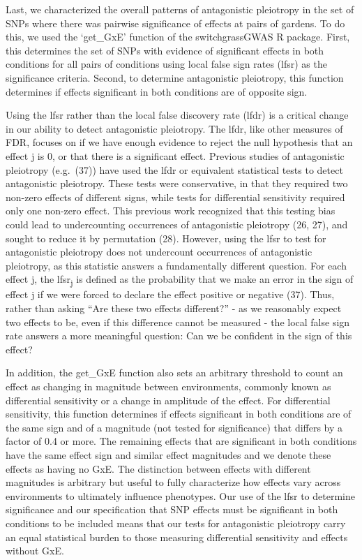 \documentclass[
  9pt,
  twocolumn,
  twoside]{pnas-new}
\begin{document}
Last, we characterized the overall patterns of antagonistic pleiotropy
in the set of SNPs where there was pairwise significance of effects at
pairs of gardens. To do this, we used the `get\_GxE' function of the
switchgrassGWAS R package. First, this determines the set of SNPs with
evidence of significant effects in both conditions for all pairs of
conditions using local false sign rates (lfsr) as the significance
criteria. Second, to determine antagonistic pleiotropy, this function
determines if effects significant in both conditions are of opposite
sign.

Using the lfsr rather than the local false discovery rate (lfdr) is a
critical change in our ability to detect antagonistic pleiotropy. The
lfdr, like other measures of FDR, focuses on if we have enough evidence
to reject the null hypothesis that an effect j is 0, or that there is a
significant effect. Previous studies of antagonistic pleiotropy
(e.g.~(37)) have used the lfdr or equivalent statistical tests to detect
antagonistic pleiotropy. These tests were conservative, in that they
required two non-zero effects of different signs, while tests for
differential sensitivity required only one non-zero effect. This
previous work recognized that this testing bias could lead to
undercounting occurrences of antagonistic pleiotropy (26, 27), and
sought to reduce it by permutation (28). However, using the lfsr to test
for antagonistic pleiotropy does not undercount occurrences of
antagonistic pleiotropy, as this statistic answers a fundamentally
different question. For each effect j, the lfsr\textsubscript{j} is
defined as the probability that we make an error in the sign of effect j
if we were forced to declare the effect positive or negative (37). Thus,
rather than asking ``Are these two effects different?'' - as we
reasonably expect two effects to be, even if this difference cannot be
measured - the local false sign rate answers a more meaningful question:
Can we be confident in the sign of this effect?

In addition, the get\_GxE function also sets an arbitrary threshold to
count an effect as changing in magnitude between environments, commonly
known as differential sensitivity or a change in amplitude of the
effect. For differential sensitivity, this function determines if
effects significant in both conditions are of the same sign and of a
magnitude (not tested for significance) that differs by a factor of 0.4
or more. The remaining effects that are significant in both conditions
have the same effect sign and similar effect magnitudes and we denote
these effects as having no GxE. The distinction between effects with
different magnitudes is arbitrary but useful to fully characterize how
effects vary across environments to ultimately influence phenotypes. Our
use of the lfsr to determine significance and our specification that SNP
effects must be significant in both conditions to be included means that
our tests for antagonistic pleiotropy carry an equal statistical burden
to those measuring differential sensitivity and effects without GxE.
\end{document}
